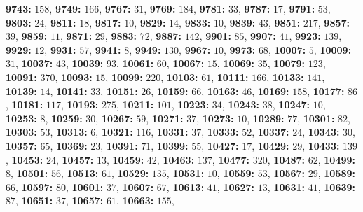 \textsf{\bfseries 9743:} $158$, \textsf{\bfseries 9749:} $166$, \textsf{\bfseries 9767:} $31$, \textsf{\bfseries 9769:} $184$, \textsf{\bfseries 9781:} $33$, \textsf{\bfseries 9787:} $17$, \textsf{\bfseries 9791:} $53$, \textsf{\bfseries 9803:} $24$, \textsf{\bfseries 9811:} $18$, \textsf{\bfseries 9817:} $10$, \textsf{\bfseries 9829:} $14$, \textsf{\bfseries 9833:} $10$, \textsf{\bfseries 9839:} $43$, \textsf{\bfseries 9851:} $217$, \textsf{\bfseries 9857:} $39$, \textsf{\bfseries 9859:} $11$, \textsf{\bfseries 9871:} $29$, \textsf{\bfseries 9883:} $72$, \textsf{\bfseries 9887:} $142$, \textsf{\bfseries 9901:} $85$, \textsf{\bfseries 9907:} $41$, \textsf{\bfseries 9923:} $139$, \textsf{\bfseries 9929:} $12$, \textsf{\bfseries 9931:} $57$, \textsf{\bfseries 9941:} $8$, \textsf{\bfseries 9949:} $130$, \textsf{\bfseries 9967:} $10$, \textsf{\bfseries 9973:} $68$, \textsf{\bfseries 10007:} $5$, \textsf{\bfseries 10009:} $31$, \textsf{\bfseries 10037:} $43$, \textsf{\bfseries 10039:} $93$, \textsf{\bfseries 10061:} $60$, \textsf{\bfseries 10067:} $15$, \textsf{\bfseries 10069:} $35$, \textsf{\bfseries 10079:} $123$, \textsf{\bfseries 10091:} $370$, \textsf{\bfseries 10093:} $15$, \textsf{\bfseries 10099:} $220$, \textsf{\bfseries 10103:} $61$, \textsf{\bfseries 10111:} $166$, \textsf{\bfseries 10133:} $141$, \textsf{\bfseries 10139:} $14$, \textsf{\bfseries 10141:} $33$, \textsf{\bfseries 10151:} $26$, \textsf{\bfseries 10159:} $66$, \textsf{\bfseries 10163:} $46$, \textsf{\bfseries 10169:} $158$, \textsf{\bfseries 10177:} $86$, \textsf{\bfseries 10181:} $117$, \textsf{\bfseries 10193:} $275$, \textsf{\bfseries 10211:} $101$, \textsf{\bfseries 10223:} $34$, \textsf{\bfseries 10243:} $38$, \textsf{\bfseries 10247:} $10$, \textsf{\bfseries 10253:} $8$, \textsf{\bfseries 10259:} $30$, \textsf{\bfseries 10267:} $59$, \textsf{\bfseries 10271:} $37$, \textsf{\bfseries 10273:} $10$, \textsf{\bfseries 10289:} $77$, \textsf{\bfseries 10301:} $82$, \textsf{\bfseries 10303:} $53$, \textsf{\bfseries 10313:} $6$, \textsf{\bfseries 10321:} $116$, \textsf{\bfseries 10331:} $37$, \textsf{\bfseries 10333:} $52$, \textsf{\bfseries 10337:} $24$, \textsf{\bfseries 10343:} $30$, \textsf{\bfseries 10357:} $65$, \textsf{\bfseries 10369:} $23$, \textsf{\bfseries 10391:} $71$, \textsf{\bfseries 10399:} $55$, \textsf{\bfseries 10427:} $17$, \textsf{\bfseries 10429:} $29$, \textsf{\bfseries 10433:} $139$, \textsf{\bfseries 10453:} $24$, \textsf{\bfseries 10457:} $13$, \textsf{\bfseries 10459:} $42$, \textsf{\bfseries 10463:} $137$, \textsf{\bfseries 10477:} $320$, \textsf{\bfseries 10487:} $62$, \textsf{\bfseries 10499:} $8$, \textsf{\bfseries 10501:} $56$, \textsf{\bfseries 10513:} $61$, \textsf{\bfseries 10529:} $135$, \textsf{\bfseries 10531:} $10$, \textsf{\bfseries 10559:} $53$, \textsf{\bfseries 10567:} $29$, \textsf{\bfseries 10589:} $66$, \textsf{\bfseries 10597:} $80$, \textsf{\bfseries 10601:} $37$, \textsf{\bfseries 10607:} $67$, \textsf{\bfseries 10613:} $41$, \textsf{\bfseries 10627:} $13$, \textsf{\bfseries 10631:} $41$, \textsf{\bfseries 10639:} $87$, \textsf{\bfseries 10651:} $37$, \textsf{\bfseries 10657:} $61$, \textsf{\bfseries 10663:} $155$, 
